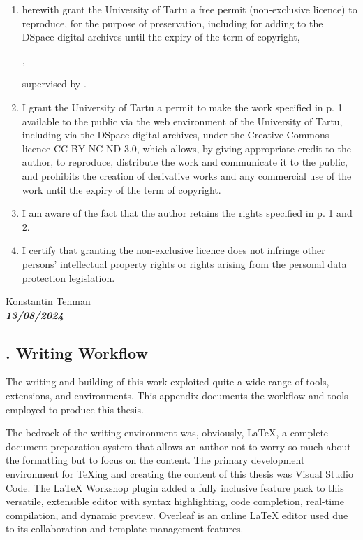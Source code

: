 \begin{enumerate}
\item
herewith grant the University of Tartu a free permit (non-exclusive licence) to
reproduce, for the purpose of preservation, including for adding to the DSpace digital archives until the expiry of the term of copyright,
\par
\textbf{\thesistitle}, %
\par
supervised by \supervisor. %
\item
I grant the University of Tartu a permit to make the work specified in p. 1 available to the public via the web environment of the University of Tartu, including via the DSpace digital archives, under the Creative Commons licence CC BY NC ND 3.0, which allows, by giving appropriate credit to the author, to reproduce, distribute the work and communicate it to the public, and prohibits the creation of derivative works and any commercial use of the work until the expiry of the term of copyright.
\item
I am aware of the fact that the author retains the rights specified in p. 1 and 2.
\item
I certify that granting the non-exclusive licence does not infringe other persons' intellectual property rights or rights arising from the personal data protection legislation. 
\end{enumerate}

\noindent
Konstantin Tenman\\ %
\textbf{\textsl{13/08/2024}}




\subsection*{. Writing Workflow} \label{appendix:writing-workflow}


The writing and building of this work exploited quite a wide range of tools, extensions, and environments. This appendix documents the workflow and tools employed to produce this thesis.

The bedrock of the writing environment was, obviously, \LaTeX{}, a complete document preparation system that allows an author not to worry so much about the formatting but to focus on the content. The primary development environment for TeXing and creating the content of this thesis was Visual Studio Code. The LaTeX Workshop plugin added a fully inclusive feature pack to this versatile, extensible editor with syntax highlighting, code completion, real-time compilation, and dynamic preview. Overleaf is an online \LaTeX{} editor used due to its collaboration and template management features.

